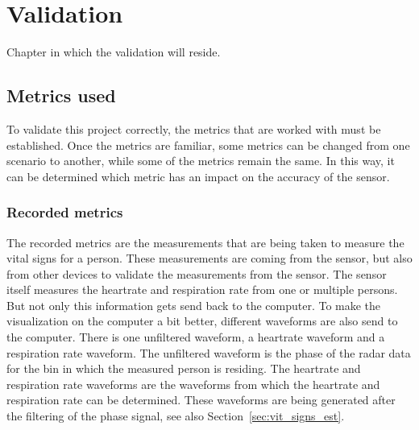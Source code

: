 \chapter{Validation}
\label{chp:validation}

Chapter in which the validation will reside.

\section{Metrics used}
To validate this project correctly, the metrics that are worked with must be established. Once the metrics are familiar, some metrics can be changed from one scenario to another, while some of the metrics remain the same. In this way, it can be determined which metric has an impact on the accuracy of the sensor. 

\subsection{Recorded metrics}
The recorded metrics are the measurements that are being taken to measure the vital signs for a person. These measurements are coming from the sensor, but also from other devices to validate the measurements from the sensor. The sensor itself measures the heartrate and respiration rate from one or multiple persons. But not only this information gets send back to the computer. To make the visualization on the computer a bit better, different waveforms are also send to the computer. There is one unfiltered waveform, a heartrate waveform and a respiration rate waveform. The unfiltered waveform is the phase of the radar data for the bin in which the measured person is residing. The heartrate and respiration rate waveforms are the waveforms from which the heartrate and respiration rate can be determined. These waveforms are being generated after the filtering of the phase signal, see also Section~\ref{sec:vit_signs_est}. 

